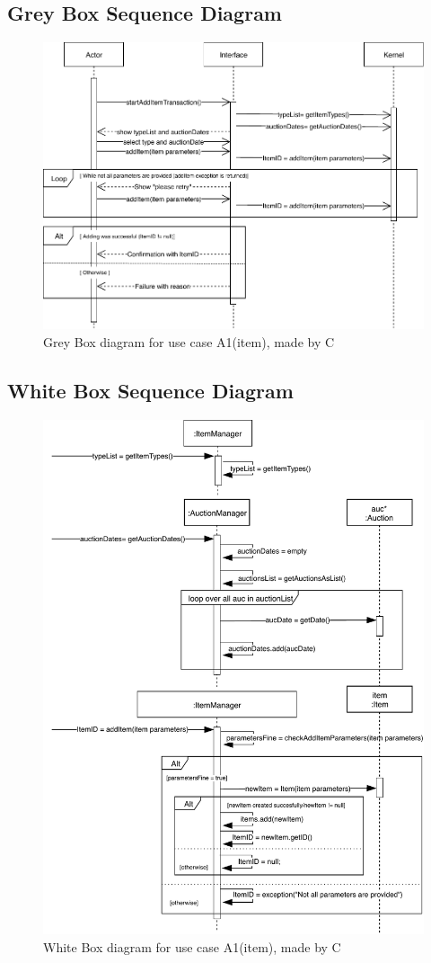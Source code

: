 \subsection*{Grey Box Sequence Diagram}
\begin{figure}[H]
	\centering
	\includegraphics[scale=.9]{uml/SD-gb-addItem.pdf}
	\caption*{Grey Box diagram for use case A1(item), made by C}
\end{figure}
\subsection*{White Box Sequence Diagram}
\begin{figure}[H]
	\centering
	\includegraphics[scale=.85]{uml/SD-wb-addItem.pdf}
	\caption*{White Box diagram for use case A1(item), made by C}
\end{figure}